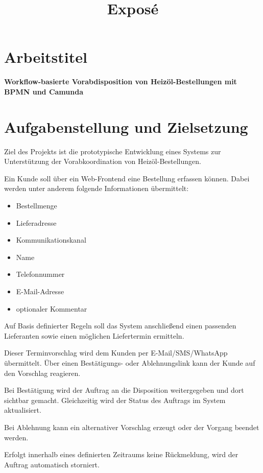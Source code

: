 \documentclass[12pt,a4paper]{article}
\title{Exposé }
\author{}
\date{}
\begin{document}
	
	\maketitle
	
	\section*{Arbeitstitel}
	
	\textbf{Workflow-basierte Vorabdisposition von Heizöl-Bestellungen mit BPMN und Camunda}
	
	\section{Aufgabenstellung und Zielsetzung}
	
	Ziel des Projekts ist die prototypische Entwicklung eines Systems zur Unterstützung der Vorabkoordination von Heizöl-Bestellungen.
	
	Ein Kunde soll über ein Web-Frontend eine Bestellung erfassen können. Dabei werden unter anderem folgende Informationen übermittelt:
	
	\begin{itemize}[leftmargin=1.5cm]
		\item Bestellmenge
		\item Lieferadresse
		\item Kommunikationskanal
		\item Name
		\item Telefonnummer
		\item E-Mail-Adresse
		\item optionaler Kommentar
	\end{itemize}
	
	Auf Basis definierter Regeln soll das System anschließend einen passenden Lieferanten sowie einen möglichen Liefertermin ermitteln.
	
	Dieser Terminvorschlag wird dem Kunden per E-Mail/SMS/WhatsApp übermittelt. Über einen Bestätigungs- oder Ablehnungslink kann der Kunde auf den Vorschlag reagieren.
	
	Bei Bestätigung wird der Auftrag an die Disposition weitergegeben und dort sichtbar gemacht. Gleichzeitig wird der Status des Auftrags im System aktualisiert.
	
	Bei Ablehnung kann ein alternativer Vorschlag erzeugt oder der Vorgang beendet werden.
	
	Erfolgt innerhalb eines definierten Zeitraums keine Rückmeldung, wird der Auftrag automatisch storniert.
	
\end{document}

